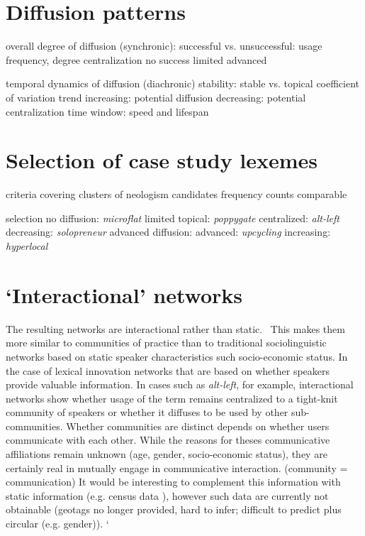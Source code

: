 \section{Diffusion patterns}

  overall degree of diffusion (synchronic): successful vs. unsuccessful: usage frequency, degree centralization
    no success
    limited
    advanced

  temporal dynamics of diffusion (diachronic)
    stability: stable vs. topical coefficient of variation
    trend
    increasing: potential diffusion
    decreasing: potential centralization
    time window: speed and lifespan


\section{Selection of case study lexemes}

  criteria
    covering clusters of neologism candidates
    frequency counts comparable

  selection
    no diffusion: \emph{microflat}
    limited
    topical: \emph{poppygate}
    centralized: \emph{alt-left}
    decreasing: \emph{solopreneur}
    advanced diffusion:
    advanced: \emph{upcycling}
    increasing: \emph{hyperlocal}

\section{`Interactional' networks}

      The resulting networks are interactional rather than static.~\parencite{Goel2016SocialDynamics} This makes them more similar to communities of practice than to traditional sociolinguistic networks based on static speaker characteristics such socio-economic status.
      In the case of lexical innovation networks that are based on whether speakers provide valuable information. In cases such as \emph{alt-left}, for example, interactional networks show whether usage of the term remains centralized to a tight-knit community of speakers or whether it diffuses to be used by other sub-communities.
      Whether communities are distinct depends on whether users communicate with each other. While the reasons for theses communicative affiliations remain unknown (age, gender, socio-economic status), they are certainly real in mutually engage in communicative interaction. (community = communication)
      It would be interesting to complement this information with static information (e.g. census data \parencite{Eisenstein2014DiffusionLexical}), however such data are currently not obtainable (geotags no longer provided, hard to infer; difficult to predict plus circular (e.g. gender)).
`

